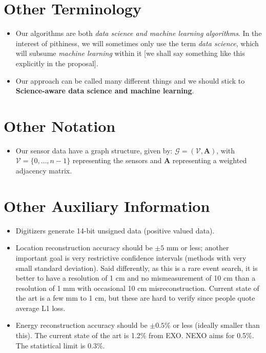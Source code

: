 \documentclass[]{article}
\providecommand{\tightlist}{%
  \setlength{\itemsep}{0pt}\setlength{\parskip}{0pt}}
\begin{document}
\section{Other Terminology}

\begin{itemize}
\tightlist
\item
  Our algorithms are both \emph{data science and machine learning algorithms}. In the interest of pithiness, we will sometimes only use the term \emph{data science}, which will subsume \emph{machine learning} within it {[}we shall say something like this explicitly in the proposal{]}.
\item
  Our approach can be called many different things and we should stick to \textbf{Science-aware data science and machine learning}.
 
  
\end{itemize}

\section{Other Notation}

\begin{itemize}
\tightlist
\item
  Our sensor data have a graph structure, given by: \(\mathcal{G} = (\mathcal{V}, \mathbf{A})\), with \(\mathcal{V} = \{0,\dots,n-1\}\) representing the sensors and \(\mathbf{A}\) representing a weighted adjacency matrix.
\end{itemize}


\section{Other Auxiliary Information}

\begin{itemize}
\tightlist
\item
  Digitizers generate 14-bit unsigned data (positive valued data).
\item
  Location reconstruction accuracy should be \(\pm 5\) mm or less; another important goal is very restrictive confidence intervals (methods with very small standard deviation).  Said differently, as this is a rare event search, it is better to have a resolution of 1 cm and no mismeasurement of 10 cm than a resolution of 1 mm with occasional 10 cm misreconstruction.  Current state of the art is a few mm to 1 cm, but these are hard to verify since people quote average L1 loss.
\item
  Energy reconstruction accuracy should be \(\pm 0.5\%\) or less (ideally smaller than this).  The current state of the art is 1.2\% from EXO.  NEXO aims for 0.5\%.  The statistical limit is 0.3\%.
\end{itemize}
\end{document}
